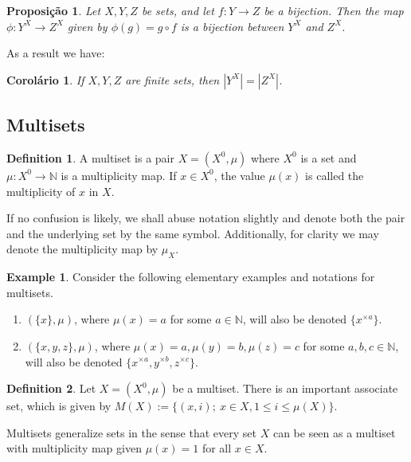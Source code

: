 \documentclass[]{article}
\newtheorem{proposition}{Proposição}[section]
\newtheorem{coro}{Corolário}[section]
\theoremstyle{definition}
\newtheorem{definition}{Definition}[section]
\theoremstyle{definition}
\newtheorem{exmp}{Example}[section]
\newcommand{\raw}{\rightarrow}
\newcommand{\bb}{\mathbb}
\begin{document}
	\begin{proposition}
		Let $X, Y, Z$ be sets, and let $f:Y\raw Z$ be a bijection. Then the map $\phi:Y^X \raw Z^X$ given by $\phi(g)=g\circ f$ is a bijection between $Y^X$ and $Z^X$.
	\end{proposition}
	
	As a result we have:
	
	\begin{coro}
		If $X, Y, Z$ are finite sets, then $|Y^X|=|Z^X|$.
	\end{coro}
	
	\subsection{Multisets}
	
	\begin{definition}
		A multiset is a pair $X = (X^0, \mu)$ where $X^0$ is a set and $\mu: X^0 \raw \bb{N}$ is a multiplicity map. If $x \in X^0$, the value $\mu(x)$ is called the multiplicity of $x$ in $X$.
	\end{definition}
	
	If no confusion is likely, we shall abuse notation slightly and denote both the pair and the underlying set by the same symbol. Additionally, for clarity we may denote the multiplicity map by $\mu_X$.
	
	\begin{exmp}
		Consider the following elementary examples and notations for multisets.
		
		\begin{enumerate}
			\item $(\{x\}, \mu)$, where $\mu(x)=a$ for some $a \in \bb{N}$, will also be denoted $\{x^{\times a} \}$.
			
			\item $(\{x, y, z\}, \mu)$, where $\mu(x)=a, \mu(y)=b, \mu(z)=c$ for some $a, b, c \in \bb{N}$, will also be denoted $\{x^{\times a},y^{\times b}, z^{\times c} \}$.
		\end{enumerate}
		
		
	\end{exmp}
	
	\begin{definition}
		Let $X = (X^0, \mu)$ be a multiset. There is an important associate set, which is given by $M(X) := \{(x, i); \ x \in X, 1\leq i \leq \mu(X) \}$. 	
	\end{definition}
	
	Multisets generalize sets in the sense that every set $X$ can be seen as a multiset with multiplicity map given $\mu(x)=1$ for all $x \in X$.
	
\end{document}
